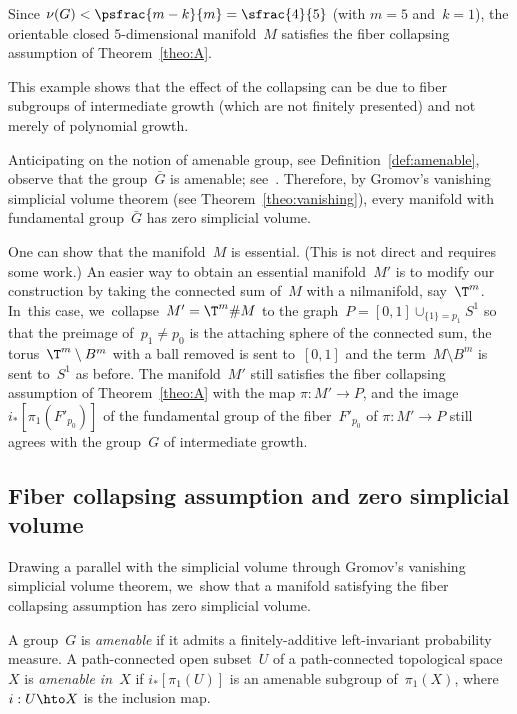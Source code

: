Since $\nu(G) < \psfrac{m-k}{m} = \sfrac{4}{5}$ (with $m=5$ and~$k=1$), the orientable closed $5$-dimensional manifold~$M$ satisfies the fiber collapsing assumption of Theorem~\ref{theo:A}.

\begin{remark}
This example shows that the effect of the collapsing can be due to fiber subgroups of intermediate growth (which are not finitely presented) and not merely of polynomial growth.
\end{remark}

\begin{remark}
Anticipating on the notion of amenable group, see Definition~\ref{def:amenable}, observe that the group~$\bar{G}$ is amenable; see~\cite{grigorchuk2}.
Therefore, by Gromov's vanishing simplicial volume theorem (see Theorem~\ref{theo:vanishing}), every manifold with fundamental group~$\bar{G}$ has zero simplicial volume.
\end{remark}

\begin{remark}
One can show that the manifold~$M$ is essential.
(This is not direct and requires some work.)
An easier way to obtain an essential manifold~$M'$ is to modify our construction by taking the connected sum of~$M$ with a nilmanifold, say~$\T^m$. In~this case, we~collapse~$M' = \T^m \# M$ to the graph~$P=[0,1] \cup_{\{1\} = p_1} S^1$ so that the preimage of~$p_1 \neq p_0$ is the attaching sphere of the connected sum, the torus~$\T^m \setminus B^m$ with a ball removed is sent to~$[0,1]$ and the term~$M \setminus B^m$ is sent to~$S^1$ as before.
The manifold~$M'$ still satisfies the fiber collapsing assumption of Theorem~\ref{theo:A} with the map $\pi:M' \to P$, and the image~$i_*[\pi_1(F'_{p_0})]$ of the fundamental group of the fiber~$F'_{p_0}$ of $\pi:M' \to P$ still agrees with the group~$G$ of intermediate growth.
\end{remark}

\subsection{Fiber collapsing assumption and zero simplicial volume} \label{sec:Gromov}

Drawing a parallel with the simplicial volume through Gromov's vanishing simplicial volume theorem, we~show that a manifold satisfying the fiber collapsing assumption has zero simplicial volume.

\begin{definition} \label{def:amenable}
A group~$G$ is \emph{amenable} if it admits a finitely-additive left-invariant probability measure.
A path-connected open subset~$U$ of a path-connected topological space~$X$ is \emph{amenable in~$X$} if $i_*[\pi_1(U)]$ is an amenable subgroup of~$\pi_1(X)$, where \mbox{$i:U \hto X$} is the inclusion map.
\end{definition}

